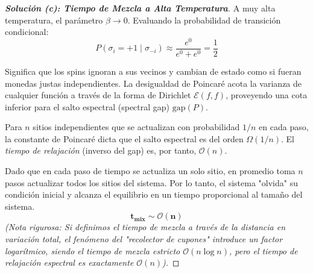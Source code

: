 \documentclass[10pt,a4paper]{article}
\begin{document}
\begin{proof}[\textbf{Solución (c): Tiempo de Mezcla a Alta Temperatura}]
    A muy alta temperatura, el parámetro $\beta \to 0$. Evaluando la probabilidad de transición condicional:
    \[ P(\sigma_i = +1 \mid \sigma_{-i}) \approx \frac{e^0}{e^0 + e^0} = \frac{1}{2} \]
    
    Significa que los spins ignoran a sus vecinos y cambian de estado como si fueran monedas justas independientes.
    La desigualdad de Poincaré acota la varianza de cualquier función a través de la forma de Dirichlet $\mathcal{E}(f,f)$, proveyendo una cota inferior para el salto espectral (spectral gap) $\text{gap}(P)$. 
    
    Para $n$ sitios independientes que se actualizan con probabilidad $1/n$ en cada paso, la constante de Poincaré dicta que el salto espectral es del orden $\Omega(1/n)$. El \textit{tiempo de relajación} (inverso del gap) es, por tanto, $\mathcal{O}(n)$.
    
    Dado que en cada paso de tiempo se actualiza un solo sitio, en promedio toma $n$ pasos actualizar todos los sitios del sistema. Por lo tanto, el sistema "olvida" su condición inicial y alcanza el equilibrio en un tiempo proporcional al tamaño del sistema.
    \[ \mathbf{t_{\text{mix}} \sim \mathcal{O}(n)} \]
    \textit{(Nota rigurosa: Si definimos el tiempo de mezcla a través de la distancia en variación total, el fenómeno del "recolector de cupones" introduce un factor logarítmico, siendo el tiempo de mezcla estricto $\mathcal{O}(n \log n)$, pero el tiempo de relajación espectral es exactamente $\mathcal{O}(n)$).}
\end{proof}

\vspace{5mm}
\end{document}
